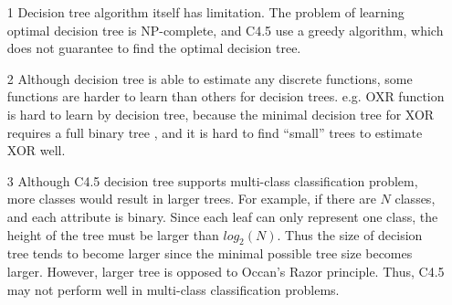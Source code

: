\documentclass[a4paper,11pt]{article}
\begin{document}
\begin{enumerate}
\item[1] Decision tree algorithm itself has limitation. The problem of learning optimal decision tree is NP-complete\cite{dtnpc}, and C4.5 use a greedy algorithm, which does not guarantee to find the optimal decision tree.
\item[2] Although decision tree is able to estimate any discrete functions, some functions are harder to learn than others for decision trees. e.g. OXR function is hard to learn by decision tree, because the minimal decision tree for XOR requires a full binary tree , and it is hard to find ``small'' trees to estimate XOR well.
\item[3] Although C4.5 decision tree supports multi-class classification problem, more classes would result in larger trees. For example, if there are $N$ classes, and each attribute is binary. Since each leaf can only represent one class, the height of the tree must be larger than $log_2(N)$. Thus the size of decision tree tends to become larger since the minimal possible tree size becomes larger. However, larger tree is opposed to Occan's Razor principle. Thus, C4.5 may not perform well in multi-class classification problems.
\end{enumerate}
\end{document}
